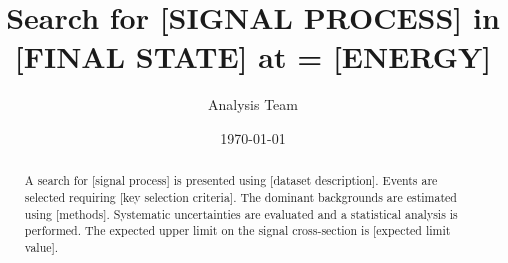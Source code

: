 \documentclass[12pt,a4paper]{article}
\title{%
  Search for [SIGNAL PROCESS] in [FINAL STATE] at \sqrts = [ENERGY]
}
\author{%
  Analysis Team
}
\date{%
  \today
}
\begin{document}
\maketitle

\begin{abstract}
A search for [signal process] is presented using [dataset description].
Events are selected requiring [key selection criteria].
The dominant backgrounds are estimated using [methods].
Systematic uncertainties are evaluated and a statistical analysis is performed.
The expected upper limit on the signal cross-section is [expected limit value].
\end{abstract}

\tableofcontents
\clearpage










% 

\appendix




\end{document}
